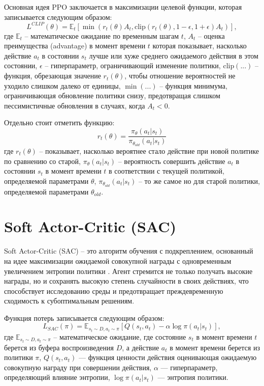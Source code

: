 Основная идея PPO заключается в максимизации целевой функции, которая записывается следующим образом:
\begin{equation}
L^{CLIP}(\theta) = \mathbb{E}_t \left[ \min \left( r_t(\theta) A_t, \text{clip}(r_t(\theta), 1 - \epsilon, 1 + \epsilon) A_t \right) \right],
\end{equation}
где 
$\mathbb{E}_t$ -- математическое ожидание по временным шагам $t$, 
$A_t$ -- оценка преимущества (advantage) в момент времени $t$ которая показывает, насколько действие $a_t$ в состоянии $s_t$ лучше или хуже среднего ожидаемого действия в этом состоянии,
$\epsilon$ -- гиперпараметр, ограничивающий изменение политики,
$\text{clip}(...)$ -- функция, обрезающая значение $r_t(\theta)$, чтобы отношение вероятностей не уходило слишком далеко от единицы,
$\min(...)$ -- функция минимума, ограничивающая обновление политики снизу, предотвращая слишком пессимистичные обновления в случаях, когда $A_t < 0$.

Отдельно стоит отметить функцию:
\begin{equation}
    r_t(\theta) = \frac{\pi_\theta(a_t|s_t)}{\pi_{\theta_{old}}(a_t|s_t)}
    \label{eq:rt}
\end{equation}
где
$r_t(\theta)$ -- показывает, насколько вероятнее стало действие при новой политике по сравнению со старой,
$\pi_\theta(a_t|s_t)$ -- вероятность совершить действие $a_t$ в состоянии $s_t$ в момент времени $t$ в соответствии с текущей политикой, определяемой параметрами $\theta$,
$\pi_{\theta_{old}}(a_t|s_t)$ -- то же самое но для старой политики, определяемой параметрами $\theta_{old}$.

\section{Soft Actor-Critic (SAC)}
Soft Actor-Critic (SAC) -- это алгоритм обучения с подкреплением, основанный на идее максимизации ожидаемой совокупной награды 
с одновременным увеличением энтропии политики \cite{lib:rlmethods}. 
Агент стремится не только получать высокие награды, но и сохранять высокую степень случайности в своих действиях, 
что способствует исследованию среды и предотвращает преждевременную сходимость к субоптимальным решениям.

Функция потерь записывается следующим образом:
\begin{equation}
L_{SAC}(\pi) = \mathbb{E}_{s_t \sim D, a_t \sim \pi} \left[ Q(s_t, a_t) - \alpha \log \pi(a_t|s_t) \right],
\end{equation}
где 
$\mathbb{E}_{s_t \sim D, a_t \sim \pi}$ -- математическое ожидание, где состояние $s_t$ в момент времени $t$ берется из буфера воспроизведения $D$,
а действие $a_t$ в момент времени берется из политики $\pi$,
$Q(s_t, a_t)$ — функция ценности действия оценивающая ожидаемую совокупную награду при совершении действия, 
$\alpha$ — гиперпараметр, определяющий влияние энтропии, 
$\log \pi(a_t|s_t)$ — энтропия политики.

